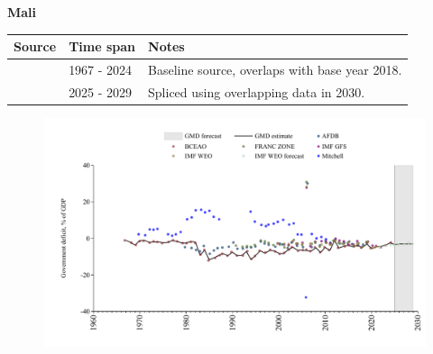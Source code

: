 \documentclass[12pt,a4paper,landscape]{article}
\begin{document}
\begin{adjustbox}{max totalsize={\paperwidth}{\paperheight},center}
\begin{minipage}[t][\textheight][t]{\textwidth}
\vspace*{0.5cm}
{}
\begin{center}
{\Large\bfseries Mali}
\end{center}
\vspace{0.5cm}
\begin{table}[H]
\centering
\small
\begin{tabular}{|l|l|l|}
\hline
\textbf{Source} & \textbf{Time span} & \textbf{Notes} \\
\hline
\rowcolor{white}\cite{BCEAO}& 1967 - 2024 &Baseline source, overlaps with base year 2018.\\
\rowcolor{lightgray}\cite{IMF_WEO_forecast}& 2025 - 2029 &Spliced using overlapping data in 2030.\\
\hline
\end{tabular}
\end{table}
\begin{figure}[H]
\centering
\includegraphics[width=\textwidth,height=0.6\textheight,keepaspectratio]{graphs/MLI_govdef_GDP.pdf}
\end{figure}
\end{minipage}
\end{adjustbox}
\end{document}
